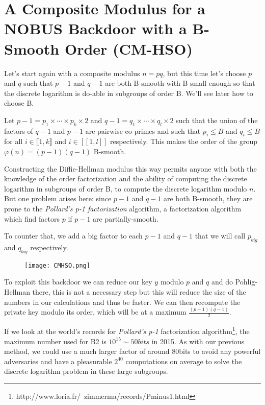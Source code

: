 \documentclass[a4paper,11pt,twocolumn]{article}
\begin{document}

\section{A Composite Modulus for a NOBUS Backdoor with a B-Smooth Order (CM-HSO)}

Let's start again with a composite modulus $n= pq$, but this time let's choose $p$ and $q$ such that $p-1$ and $q-1$ are both B-smooth with B small enough so that the discrete logarithm is do-able in subgroups of order B. We'll see later how to choose B.

Let $p-1 = p_1 \times \cdots \times p_k \times 2$ and $q-1 = q_1 \times \cdots \times q_l \times 2$ such that the union of the factors of $q-1$ and $p-1$ are pairwise co-primes and such that $p_i \leq B$ and $q_i \leq B$ for all $i \in \llbracket 1,k \rrbracket$ and $i \in [[1,l]]$ respectively. This makes the order of the group $\varphi(n) = (p-1)(q-1)$ B-smooth.

Constructing the Diffie-Hellman modulus this way permits anyone with both the knowledge of the order factorization and the ability of computing the discrete logarithm in subgroups of order B, to compute the discrete logarithm modulo $n$. But one problem arises here: since $p-1$ and $q-1$ are both B-smooth, they are prone to the \emph{Pollard's p-1 factorization} algorithm, a factorization algorithm which find factors $p$ if $p-1$ are partially-smooth.

To counter that, we add a big factor to each $p-1$ and $q-1$ that we will call $p_{big}$ and $q_{big}$ respectively. 

\begin{figure}[H]
\centering
\texttt{[image: CMHSO.png]}
\end{figure}

To exploit this backdoor we can reduce our key $y$ modulo $p$ and $q$ and do Pohlig-Hellman there, this is not a necessary step but this will reduce the size of the numbers in our calculations and thus be faster. We can then recompute the private key modulo its order, which will be at a maximum $\frac{(p-1)(q-1)}{2}$.

If we look at the world's records for \emph{Pollard's p-1} factorization algorithm\footnote{http://www.loria.fr/~zimmerma/records/Pminus1.html}, the maximum number used for B2 is $10^{15} \sim 50bits$ in 2015. As with our previous method, we could use a much larger factor of around 80bits to avoid any powerful adversaries and have a pleasurable $2^{40}$ computations on average to solve the discrete logarithm problem in these large subgroups.
\end{document}

